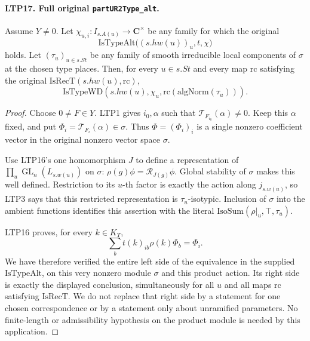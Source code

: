 \documentclass[11pt,a4paper]{article}
\numberwithin{equation}{section}
\theoremstyle{remark}\newtheorem{remark}[theorem]{Remark}
\begin{document}
\paragraph{LTP17. Full original \texttt{part\allowbreak UR2Type\_\allowbreak alt}.}
\label{claim:LTP17}
Assume \(Y\ne0\).  Let
\(\chi_{u,i}:I_{s.A(u)}\to\mathbf C^\times\) be any family
for which the original
\[
      \mathrm{IsTypeAlt}\bigl((s.hw(u))_u,t,\chi\bigr)
\]
holds.  Let \((\tau_u)_{u\in s.St}\) be any family of smooth
irreducible local components of \(\sigma\) at the chosen type
places.  Then, for every \(u\in s.St\) and every map
\(\mathrm{rc}\) satisfying the original
\(\mathrm{IsRecT}(s.hw(u),\mathrm{rc})\),
\[
        \mathrm{IsTypeWD}\!
          \left(s.hw(u),\chi_u,
                         \mathrm{rc}(\mathrm{algNorm}(\tau_u))\right).
\]
\begin{proof}
Choose \(0\ne F\in Y\).  LTP1 gives \(i_0,\alpha\) such that
\(\mathcal T_{F_{i_0}}(\alpha)\ne0\).  Keep this \(\alpha\)
fixed, and put
\(\Phi_i=\mathcal T_{F_i}(\alpha)\in\sigma\).
Thus \(\Phi=(\Phi_i)_i\) is a single nonzero coefficient vector
in the original nonzero vector space \(\sigma\).

Use LTP16's one homomorphism \(J\) to define a representation
of \(\prod_u\operatorname{GL}_n(L_{s.w(u)})\) on \(\sigma\):
\(\rho(g)\phi=\mathscr R_{J(g)}\phi\).
Global stability of \(\sigma\) makes this well defined.
Restriction to its \(u\)-th factor is exactly the action along
\(j_{s.w(u)}\), so LTP3 says that this restricted representation
is \(\tau_u\)-isotypic.  Inclusion of \(\sigma\) into the ambient
functions identifies this assertion with the literal
\(\mathrm{IsoSum}(\rho|_u,\top,\tau_u)\).

LTP16 proves, for every \(k\in K_T\),
\[
                   \sum_b t(k)_{ib}\rho(k)\Phi_b=\Phi_i .
\]
We have therefore verified the entire left side of the equivalence
in the supplied \(\mathrm{IsTypeAlt}\), on this very nonzero
module \(\sigma\) and this product action.  Its right side is
exactly the displayed conclusion, simultaneously for all \(u\)
and all maps \(\mathrm{rc}\) satisfying \(\mathrm{IsRecT}\).
We do not replace that right side by a statement for one chosen
correspondence or by a statement only about unramified parameters.
No finite-length or admissibility hypothesis on the product
module is needed by this application.
\end{proof}

\end{document}
